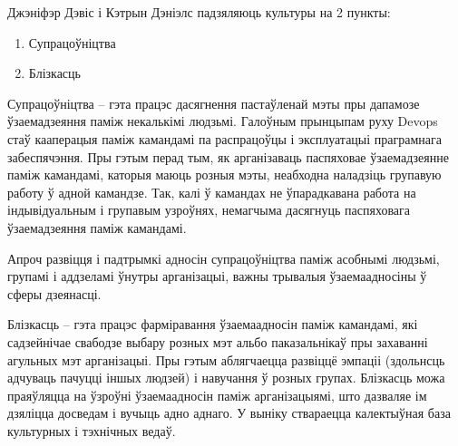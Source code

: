 Джэніфэр Дэвіс і Кэтрын Дэніэлс падзяляюць культуры на 2 пункты:

\begin{enumerate}
    \item Супрацоўніцтва
    \item Блізкасць
\end{enumerate}

Супрацоўніцтва -- гэта працэс дасягнення пастаўленай мэты
пры дапамозе ўзаемадзеяння паміж некалькімі людзьмі.
Галоўным прынцыпам руху Devops стаў кааперацыя паміж
камандамі па распрацоўцы і эксплуатацыі праграмнага забеспячэння.
Пры гэтым перад тым, як арганізаваць паспяховае
ўзаемадзеянне паміж камандамі, каторыя маюць розныя мэты,
неабходна наладзіць групавую работу ў адной камандзе.
Так, калі ў камандах не ўпарадкавана работа на індывідуальным
і групавым узроўнях, немагчыма дасягнуць паспяховага ўзаемадзеяння
паміж камандамі.

Апроч развіцця і падтрымкі адносін супрацоўніцтва паміж
асобнымі людзьмі, групамі і аддзеламі ўнутры арганізацыі,
важны трывалыя ўзаемаадносіны ў сферы дзеянасці.

Блізкасць -- гэта працэс фарміравання ўзаемаадносін паміж
камандамі, які садзейнічае свабодзе выбару розных мэт альбо
паказальнікаў пры захаванні агульных мэт арганізацыі.
Пры гэтым аблягчаецца развіццё эмпаціі
(здольнсць адчуваць пачуцці іншых людзей)
і навучання ў розных групах.
Блізкасць можа праяўляцца на ўзроўні ўзаемаадносін паміж
арганізацыямі, што дазваляе ім дзяліцца досведам і вучыць адно
аднаго. У выніку ствараецца калектыўная база культурных і тэхнічных ведаў.

%

